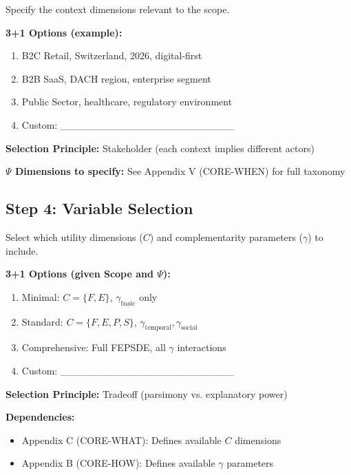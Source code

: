 Specify the context dimensions relevant to the scope.

\begin{tcolorbox}[colback=white, colframe=black,
    title=Step 3: Context Specification]
\textbf{3+1 Options (example):}
\begin{enumerate}
\item[$\square$] B2C Retail, Switzerland, 2026, digital-first
\item[$\square$] B2B SaaS, DACH region, enterprise segment
\item[$\square$] Public Sector, healthcare, regulatory environment
\item[$\square$] Custom: \_\_\_\_\_\_\_\_\_\_\_\_\_\_\_\_\_\_\_\_\_\_\_\_
\end{enumerate}

\textbf{Selection Principle:} Stakeholder (each context implies different actors)

\textbf{$\Psi$ Dimensions to specify:} See Appendix V (CORE-WHEN) for full taxonomy
\end{tcolorbox}

\subsection{Step 4: Variable Selection}

Select which utility dimensions ($C$) and complementarity parameters ($\gamma$) to include.

\begin{tcolorbox}[colback=white, colframe=black,
    title=Step 4: Variable Selection]
\textbf{3+1 Options (given Scope and $\Psi$):}
\begin{enumerate}
\item[$\square$] Minimal: $C = \{F, E\}$, $\gamma_{\text{basic}}$ only
\item[$\square$] Standard: $C = \{F, E, P, S\}$, $\gamma_{\text{temporal}}, \gamma_{\text{social}}$
\item[$\square$] Comprehensive: Full FEPSDE, all $\gamma$ interactions
\item[$\square$] Custom: \_\_\_\_\_\_\_\_\_\_\_\_\_\_\_\_\_\_\_\_\_\_\_\_
\end{enumerate}

\textbf{Selection Principle:} Tradeoff (parsimony vs. explanatory power)

\textbf{Dependencies:}
\begin{itemize}[nosep]
\item Appendix C (CORE-WHAT): Defines available $C$ dimensions
\item Appendix B (CORE-HOW): Defines available $\gamma$ parameters
\end{itemize}
\end{tcolorbox}

